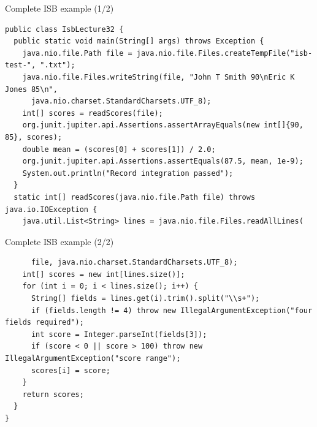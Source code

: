 \documentclass[10pt,aspectratio=169]{beamer}
\begin{document}
\begin{frame}[fragile,t]{Complete ISB example (1/2)}
\begin{lstlisting}
public class IsbLecture32 {
  public static void main(String[] args) throws Exception {
    java.nio.file.Path file = java.nio.file.Files.createTempFile("isb-test-", ".txt");
    java.nio.file.Files.writeString(file, "John T Smith 90\nEric K Jones 85\n",
      java.nio.charset.StandardCharsets.UTF_8);
    int[] scores = readScores(file);
    org.junit.jupiter.api.Assertions.assertArrayEquals(new int[]{90, 85}, scores);
    double mean = (scores[0] + scores[1]) / 2.0;
    org.junit.jupiter.api.Assertions.assertEquals(87.5, mean, 1e-9);
    System.out.println("Record integration passed");
  }
  static int[] readScores(java.nio.file.Path file) throws java.io.IOException {
    java.util.List<String> lines = java.nio.file.Files.readAllLines(
\end{lstlisting}
\end{frame}

\begin{frame}[fragile,t]{Complete ISB example (2/2)}
\begin{lstlisting}
      file, java.nio.charset.StandardCharsets.UTF_8);
    int[] scores = new int[lines.size()];
    for (int i = 0; i < lines.size(); i++) {
      String[] fields = lines.get(i).trim().split("\\s+");
      if (fields.length != 4) throw new IllegalArgumentException("four fields required");
      int score = Integer.parseInt(fields[3]);
      if (score < 0 || score > 100) throw new IllegalArgumentException("score range");
      scores[i] = score;
    }
    return scores;
  }
}
\end{lstlisting}
\end{frame}
\end{document}
